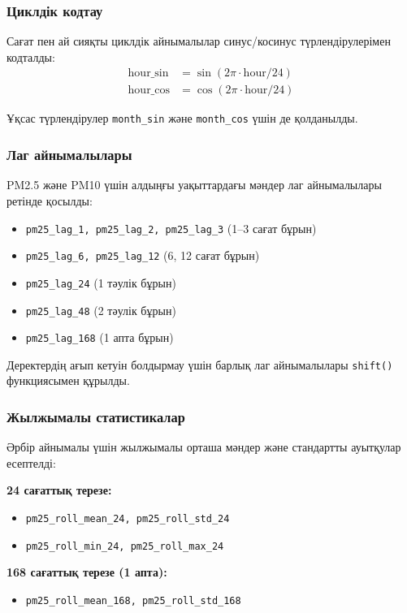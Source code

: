 \documentclass[12pt,a4paper]{article}
\begin{document}
\subsubsection{Циклдік кодтау}

Сағат пен ай сияқты циклдік айнымалылар синус/косинус түрлендірулерімен кодталды:
\begin{align}
\text{hour\_sin} &= \sin(2\pi \cdot \text{hour} / 24) \\
\text{hour\_cos} &= \cos(2\pi \cdot \text{hour} / 24)
\end{align}

Ұқсас түрлендірулер \texttt{month\_sin} және \texttt{month\_cos} үшін де қолданылды.

\subsubsection{Лаг айнымалылары}

PM2.5 және PM10 үшін алдыңғы уақыттардағы мәндер лаг айнымалылары ретінде қосылды:
\begin{itemize}
\item \texttt{pm25\_lag\_1, pm25\_lag\_2, pm25\_lag\_3} (1–3 сағат бұрын)
\item \texttt{pm25\_lag\_6, pm25\_lag\_12} (6, 12 сағат бұрын)
\item \texttt{pm25\_lag\_24} (1 тәулік бұрын)
\item \texttt{pm25\_lag\_48} (2 тәулік бұрын)
\item \texttt{pm25\_lag\_168} (1 апта бұрын)
\end{itemize}

Деректердің ағып кетуін болдырмау үшін барлық лаг айнымалылары \texttt{shift()} функциясымен құрылды.

\subsubsection{Жылжымалы статистикалар}

Әрбір айнымалы үшін жылжымалы орташа мәндер және стандартты ауытқулар есептелді:

\textbf{24 сағаттық терезе:}
\begin{itemize}
\item \texttt{pm25\_roll\_mean\_24, pm25\_roll\_std\_24}
\item \texttt{pm25\_roll\_min\_24, pm25\_roll\_max\_24}
\end{itemize}

\textbf{168 сағаттық терезе (1 апта):}
\begin{itemize}
\item \texttt{pm25\_roll\_mean\_168, pm25\_roll\_std\_168}
\end{itemize}
\end{document}
